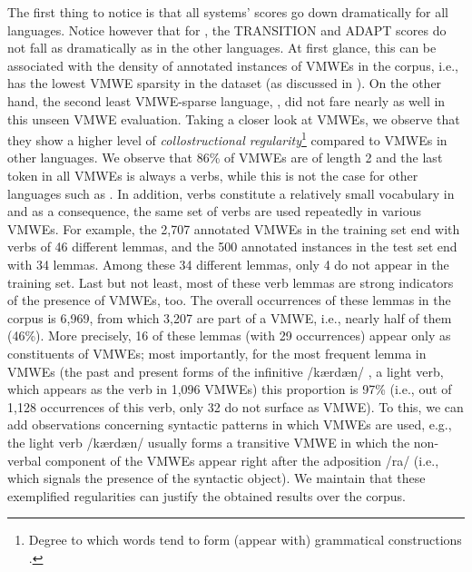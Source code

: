 \documentclass[output=paper
,modfonts
,nonflat,draftmode]{langsci/langscibook}
\begin{document}
The first thing to notice is that all systems' scores go down dramatically for all languages. Notice however that for , the TRANSITION and ADAPT scores do not fall as dramatically as in the other languages. At first glance, this can be associated with the density of annotated instances of VMWEs in the  corpus, i.e.,  has the lowest VMWE sparsity in the dataset (as discussed in ). On the other hand, the second least VMWE-sparse language, , did not fare nearly as well in this unseen VMWE evaluation. Taking a closer look at  VMWEs, we observe that they show a higher level of \emph{collostructional regularity}\footnote{Degree to which words tend to form (appear with) grammatical constructions \citep{collostructional}.} compared to VMWEs in other languages. We observe that 86\% of  VMWEs are of length 2 and the last token in all  VMWEs is always a verbs, while this is not the case for other languages such as . In addition, verbs constitute a relatively small vocabulary in  and as a consequence, the same set of verbs are used repeatedly in various VMWEs. For example, the 2,707 annotated VMWEs in the  training set end with verbs of 46 different lemmas, and the 500 annotated instances in the test set end with 34 lemmas. Among these 34 different lemmas, only 4 do not appear in the training set. Last but not least, most of these verb lemmas are strong indicators of the presence of VMWEs, too. The overall occurrences of these lemmas in the  corpus is 6,969, from which 3,207 are part of a VMWE, i.e., nearly half of them (46\%). More precisely, 16 of these lemmas (with 29 occurrences) appear only as constituents of VMWEs; most importantly, for the most frequent lemma in VMWEs (the past and present forms of the infinitive {} /kærdæn/ , a light verb, which appears as the verb in 1,096 VMWEs) this proportion is 97\% (i.e., out of 1,128 occurrences of this verb, only 32 do not surface as VMWE). To this, we can add observations concerning syntactic patterns in which VMWEs are used, e.g., the light verb {} /kærdæn/ usually forms a transitive VMWE in which the non-verbal component of the VMWEs appear right after the adposition  {} /ra/ (i.e., which signals the presence of the syntactic object).  We maintain that these exemplified regularities can justify the obtained results over the  corpus.  
\end{document}
